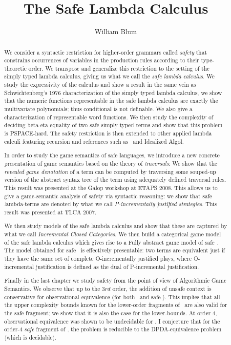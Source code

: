 \documentclass[a4paper,twoside,openright,draft]{ociamthesis}
\author{William Blum}
\title{The Safe Lambda Calculus}
\begin{document}
\maketitle

\begin{abstract}
We consider a syntactic restriction for higher-order grammars called \emph{safety}  that  constrains occurrences of variables in the production rules according to their type-theoretic order. We transpose and generalize this restriction to the setting of the simply typed lambda calculus, giving us what we call the \emph{safe lambda calculus}.  We study the expressivity of the calculus and show a result in the same vein as Schwichtenberg's 1976 characterization of the simply typed lambda calculus, we show that the numeric functions representable in the safe lambda calculus are exactly the
multivariate polynomials; thus conditional is not definable. We
also give a characterization of representable word functions.
We then study the complexity of deciding beta-eta equality of two safe simply typed terms and show that this problem is PSPACE-hard. The safety restriction is then extended to other applied lambda calculi featuring recursion and references such as \pcf\ and Idealized Algol.

In order to study the game semantics of safe languages, we introduce a new concrete presentation of game semantics based on the theory of \emph{traversals}: We show that the \emph{revealed game denotation} of a term can be computed by traversing some souped-up version of the abstract syntax tree of the term using adequately defined traversal rules. This result was presented at the Galop workshop at ETAPS 2008. This allows us to give a game-semantic analysis of safety via syntactic reasoning: we show that safe lambda-terms are denoted by what we call \emph{P-incrementally justified strategies}. This result was presented at TLCA 2007.

We then study models of the safe lambda calculus and show that these are captured by what we call \emph{Incremental Closed Categories}. We then build a categorical game model of the safe lambda calculus which gives rise to a Fully abstract game model of safe \ialgol.
The model obtained for safe \ialgol\ is effectively presentable: two terms are equivalent just if they have the same set of complete O-incrementally justified plays, where O-incremental justification is defined as the dual of P-incremental justification.

Finally in the last chapter we study safety from the point of view of Algorithmic Game Semantics.  We observe that up to the $3rd$ order, the addition of unsafe context is conservative for observational equivalence (for both \ialgol\ and safe \ialgol). This implies that all the upper complexity bounds known for the lower-order fragments of \ialgol\ are also valid for the safe fragment; we show that it is also the case for the lower-bounds. At order $4$, observational equivalence was shown to be undecidable for \ialgol.
I conjecture that for the order-$4$ \emph{safe} fragment of \ialgol, the problem is reducible to the DPDA-equivalence problem (which is decidable).


\end{abstract}
\end{document}
